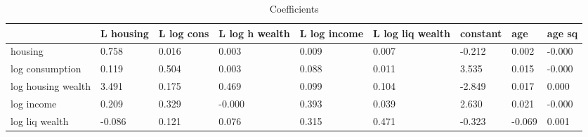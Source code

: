 \begin{table}[htbp]
\caption{\label{clabel} Coefficients}\centering\medskip
\begin{tabular}{lllllllll} \hline \hline
 & L housing  & L log cons  & L log h wealth  & L log income  & L log liq wealth  & constant  & age  & age sq  \\  \hline 
housing &     0.758 &     0.016 &     0.003 &     0.009 &     0.007 &    -0.212 &     0.002 &    -0.000 \\  
log consumption &     0.119 &     0.504 &     0.003 &     0.088 &     0.011 &     3.535 &     0.015 &    -0.000 \\  
log housing wealth &     3.491 &     0.175 &     0.469 &     0.099 &     0.104 &    -2.849 &     0.017 &     0.000 \\  
log income &     0.209 &     0.329 &    -0.000 &     0.393 &     0.039 &     2.630 &     0.021 &    -0.000 \\  
log liq wealth &    -0.086 &     0.121 &     0.076 &     0.315 &     0.471 &    -0.323 &    -0.069 &     0.001 \\  
\hline \hline \end{tabular}
\end{table}
